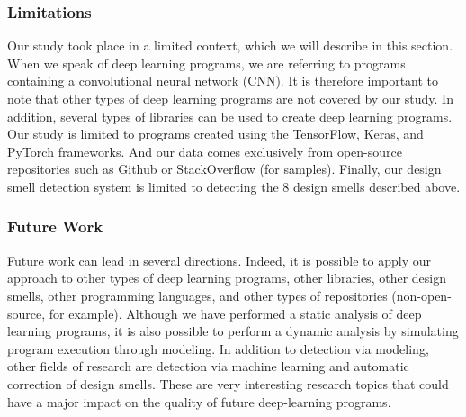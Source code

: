 \label{sec:limitationsFutureWork}

\subsubsection{Limitations}
\label{sec:limitations}
Our study took place in a limited context, which we will describe in this section. When we speak of deep learning programs, we are referring to programs containing a convolutional neural network (CNN). It is therefore important to note that other types of deep learning programs are not covered by our study. In addition, several types of libraries can be used to create deep learning programs. Our study is limited to programs created using the TensorFlow, Keras, and PyTorch frameworks. And our data comes exclusively from open-source repositories such as Github or StackOverflow (for samples). Finally, our design smell detection system is limited to detecting the 8 design smells described above.\\

\subsubsection{Future Work}
\label{sec:futureWork}
Future work can lead in several directions. Indeed, it is possible to apply our
approach to other types of deep learning programs, other libraries, other design
smells, other programming languages, and other types of repositories (non-open-source, for example). Although we have performed a static analysis of deep
learning programs, it is also possible to perform a dynamic analysis by
simulating program execution through modeling. In addition to detection via
modeling, other fields of research are detection via machine learning and
automatic correction of design smells. These are very interesting research
topics that could have a major impact on the quality of future deep-learning
programs.






